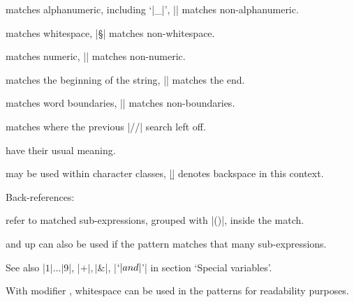 \documentclass{refbase}
\begin{document}
\begin{enum}{1cm}

matches alphanumeric, including `|_|', |\W| matches non-alphanumeric.

matches whitespace, |\S| matches non-whitespace.

matches numeric, |\D| matches non-numeric.

matches the beginning of the string, |\Z| matches the end.

matches word boundaries, |\B| matches non-boundaries.

matches where the previous |//| search left off.

have their usual meaning.

 may be used within character classes, |\b| denotes backspace in this context.

\end{enum}

\xtraspace
Back-references:

\begin{enum}{1cm}

refer to matched sub-expressions, grouped with |()|, inside the match. 

and up can also be used if the pattern
matches that many sub-expressions. 

\end{enum}

See also |$1|\ldots|$9|, |$+|, |$&|, |$`| and |$'| in section `Special
variables'.

\xtraspace
With modifier , whitespace can be used in the patterns for
readability purposes.
\end{document}
